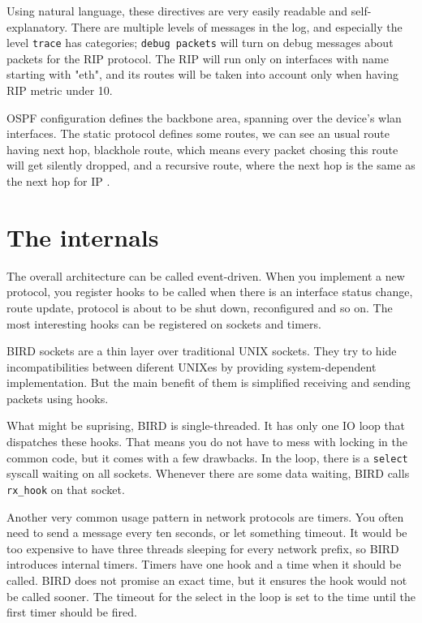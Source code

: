 

Using natural language, these directives are very easily readable and
self-explanatory. There are multiple levels of messages in the log, and
especially the level \texttt{trace} has categories; \texttt{debug packets}
will turn on debug messages about packets for the RIP protocol. The RIP will
run only on interfaces with name starting with "eth", and its routes will be
taken into account only when having RIP metric under 10.

OSPF configuration defines the backbone area, spanning over the device's wlan
interfaces. The static protocol defines some routes, we can see an usual route
having next hop, blackhole route, which means every packet chosing this route
will get silently dropped, and a recursive route, where the next hop is the
same as the next hop for IP .

\section{The internals}
The overall architecture can be called event-driven. When you implement a new
protocol, you register hooks to be called when there is an interface status
change, route update, protocol is about to be shut down, reconfigured and so on.
The most interesting hooks can be registered on sockets and timers.

BIRD sockets are a thin layer over traditional UNIX sockets. They try to hide
incompatibilities between diferent UNIXes by providing system-dependent
implementation. But the main benefit of them is simplified receiving and
sending packets using hooks.

What might be suprising, BIRD is single-threaded. It has only one IO loop that
dispatches these hooks. That means you do not have to mess with locking in the
common code, but it comes with a few drawbacks. In the loop, there is
a \texttt{select} syscall waiting on all sockets. Whenever there are some data
waiting, BIRD calls \verb|rx_hook| on that socket.

Another very common usage pattern in network protocols are timers. You often
need to send a message every ten seconds, or let something timeout. It would be
too expensive to have three threads sleeping for every network prefix, so BIRD
introduces internal timers. Timers have one hook and a time when it should be
called. BIRD does not promise an exact time, but it ensures the hook would not
be called sooner. The timeout for the select in the loop is set to the time
until the first timer should be fired.

